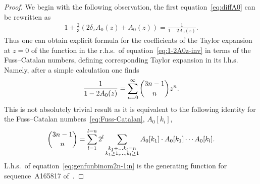 \documentclass[pdftex]{sigma}
\numberwithin{equation}{section}
\begin{document}
\begin{proof}
We begin with the following observation, the first equation~\eqref{eq:diffA0} can be rewritten as
\begin{gather}\label{eq:1-2A0z-inv}
1+\frac23\left(2\delta_zA_0(z)+A_0(z)\right)=\frac1{1-2A_0(z)}.
\end{gather}
Thus one can obtain explicit formula for the coefficients of the Taylor expansion at $z=0$ of the function in the
r.h.s.\ of equation~\eqref{eq:1-2A0z-inv} in terms of the Fuss--Catalan numbers, defining corresponding Taylor
expansion in its l.h.s. Namely, after a simple calculation one finds
\begin{gather}\label{eq:genfunbinom2n-1:n}
\frac1{1-2A_0(z)}=\sum\limits_{n=0}^{\infty}\dbinom{3n-1}{n}z^n.
\end{gather}
This is not absolutely trivial result as it is equivalent to the following identity for the Fuss--Catalan
numbers~\eqref{eq:Fuss-Catalan}, $A_0[k_i]$,
\begin{gather*}
\dbinom{3n-1}{n}=\sum\limits_{l=1}^{l=n}2^l\sum\limits_{\substack{k_1+\ldots k_l=n\\k_1\geq1,\ldots,k_l\geq1}}
A_0[k_1]\cdot A_0[k_1]\cdots A_0[k_l].
\end{gather*}
L.h.s.\ of equation~\eqref{eq:genfunbinom2n-1:n} is the generating function for sequence~A165817 of~\cite{OEIS}.


\end{proof}
\end{document}
